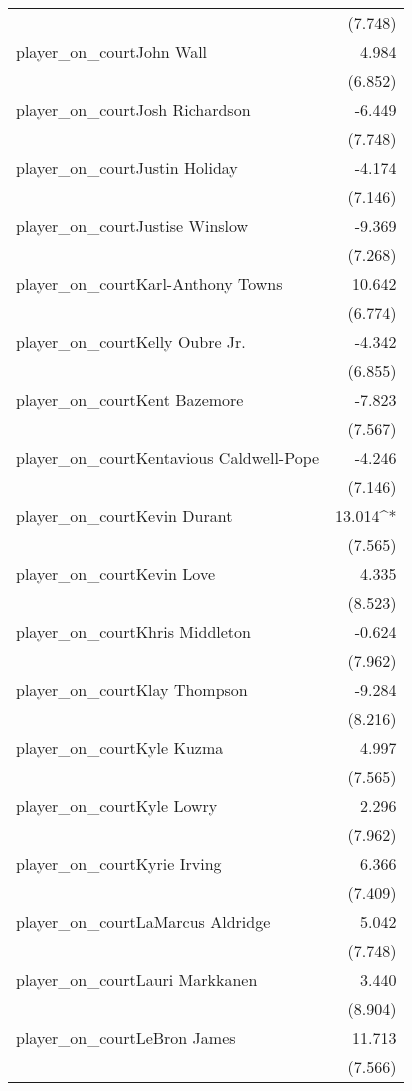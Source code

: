 \documentclass[
  landscape]{article}
\begin{document}
\begin{table}[!htbp]
\begin{tabular}{@{\extracolsep{5pt}}lD{.}{.}{-3} }
  & (7.748) \\ 
  player\_on\_courtJohn Wall & 4.984 \\ 
  & (6.852) \\ 
  player\_on\_courtJosh Richardson & -6.449 \\ 
  & (7.748) \\ 
  player\_on\_courtJustin Holiday & -4.174 \\ 
  & (7.146) \\ 
  player\_on\_courtJustise Winslow & -9.369 \\ 
  & (7.268) \\ 
  player\_on\_courtKarl-Anthony Towns & 10.642 \\ 
  & (6.774) \\ 
  player\_on\_courtKelly Oubre Jr. & -4.342 \\ 
  & (6.855) \\ 
  player\_on\_courtKent Bazemore & -7.823 \\ 
  & (7.567) \\ 
  player\_on\_courtKentavious Caldwell-Pope & -4.246 \\ 
  & (7.146) \\ 
  player\_on\_courtKevin Durant & 13.014^{*} \\ 
  & (7.565) \\ 
  player\_on\_courtKevin Love & 4.335 \\ 
  & (8.523) \\ 
  player\_on\_courtKhris Middleton & -0.624 \\ 
  & (7.962) \\ 
  player\_on\_courtKlay Thompson & -9.284 \\ 
  & (8.216) \\ 
  player\_on\_courtKyle Kuzma & 4.997 \\ 
  & (7.565) \\ 
  player\_on\_courtKyle Lowry & 2.296 \\ 
  & (7.962) \\ 
  player\_on\_courtKyrie Irving & 6.366 \\ 
  & (7.409) \\ 
  player\_on\_courtLaMarcus Aldridge & 5.042 \\ 
  & (7.748) \\ 
  player\_on\_courtLauri Markkanen & 3.440 \\ 
  & (8.904) \\ 
  player\_on\_courtLeBron James & 11.713 \\ 
  & (7.566) \\ 

\end{tabular}
\end{table}
\end{document}
